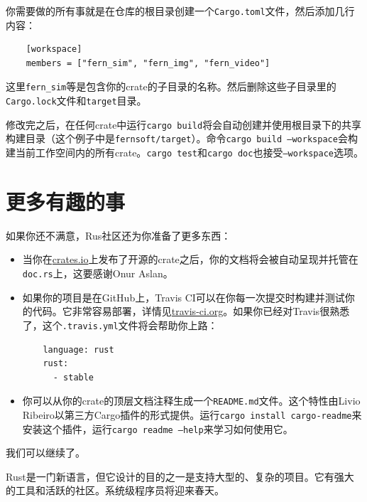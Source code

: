 你需要做的所有事就是在仓库的根目录创建一个\texttt{Cargo.toml}文件，然后添加几行内容：
\begin{verbatim}
    [workspace]
    members = ["fern_sim", "fern_img", "fern_video"]
\end{verbatim}
这里\texttt{fern\_sim}等是包含你的crate的子目录的名称。然后删除这些子目录里的\texttt{Cargo.lock}文件和\texttt{target}目录。

修改完之后，在任何crate中运行\texttt{cargo build}将会自动创建并使用根目录下的共享构建目录（这个例子中是\texttt{fernsoft/target}）。命令\texttt{cargo build --workspace}会构建当前工作空间内的所有crate。\texttt{cargo test}和\texttt{cargo doc}也接受\texttt{--workspace}选项。

\section{更多有趣的事}

如果你还不满意，Rus社区还为你准备了更多东西：
\begin{itemize}
    \item 当你在\href{https://crates.io}{crates.io}上发布了开源的crate之后，你的文档将会被自动呈现并托管在\texttt{doc.rs}上，这要感谢Onur Aslan。
    \item 如果你的项目是在GitHub上，Travis CI可以在你每一次提交时构建并测试你的代码。它非常容易部署，详情见\href{https://travis-ci.org}{travis-ci.org}。如果你已经对Travis很熟悉了，这个\texttt{.travis.yml}文件将会帮助你上路：
    \begin{verbatim}
    language: rust
    rust:
      - stable
    \end{verbatim}
    \item 你可以从你的crate的顶层文档注释生成一个\texttt{README.md}文件。这个特性由Livio Ribeiro以第三方Cargo插件的形式提供。运行\texttt{cargo install cargo-readme}来安装这个插件，运行\texttt{cargo readme --help}来学习如何使用它。
\end{itemize}

我们可以继续了。

Rust是一门新语言，但它设计的目的之一是支持大型的、复杂的项目。它有强大的工具和活跃的社区。系统级程序员将迎来春天。
